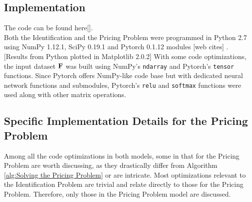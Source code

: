 \begin{appendices}
    \section{Implementation} \label{sec:Implementation}
    The code can be found here[]. \\
    Both the Identification and the Pricing Problem were programmed in Python 2.7 using NumPy 1.12.1, SciPy 0.19.1 and Pytorch 0.1.12 modules [web cites] \cite{SCPOptimizeDocs}\cite{NPDocs}. [Results from Python plotted in Matplotlib 2.0.2] With some code optimizations, the input dataset $\mathbf{F}$ was built using NumPy's \texttt{ndarray} and Pytorch's \texttt{tensor} functions. Since Pytorch offers NumPy-like code base but with dedicated neural network functions and submodules, Pytorch's \texttt{relu} and \texttt{softmax} functions were used along with other matrix operations.\\
    
    \subsection{Specific Implementation Details for the Pricing Problem}
    Among all the code optimizations in both models, some in that for the Pricing Problem are worth discussing, as they drastically differ from Algorithm \ref{alg:Solving the Pricing Problem} or are intricate. Most optimizations relevant to the Identification Problem are trivial and relate directly to those for the Pricing Problem. Therefore, only those in the Pricing Problem model are discussed.
    

\end{appendices}
